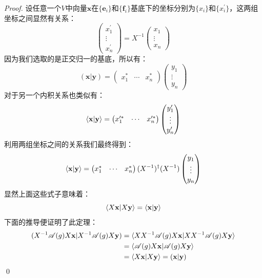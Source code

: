 \begin{proof}
	设任意一个$V$中向量$\mathbf{x}$在$\{\mathbf{e}_i\}$和$\{\mathbf{f}_i\}$基底下的坐标分别为$\{x_i\}$和$\{x^\prime_i\}$，这两组坐标之间显然有关系：
	\[\begin{pmatrix}
		{x^\prime_1} \\
		\vdots \\
		{x^\prime_n}
	\end{pmatrix}=X^{-1}\begin{pmatrix}
		{x_1} \\
		\vdots \\
		{x_n}
	\end{pmatrix}\]
	因为我们选取的是正交归一的基底，所以有：
	\[(\mathbf{x}|\mathbf{y}) = \begin{pmatrix}
		x_1^*& \cdots  &x_n^*
	\end{pmatrix}\begin{pmatrix}
		{y_1} \\
		\vdots \\
		{y_n}
	\end{pmatrix}\]
	对于另一个内积关系也类似有：
	\[\braket{\mathbf{x}|\mathbf{y}} = \begin{pmatrix}
		x_1^{\prime*}& \cdots  &x_n^{\prime*}
	\end{pmatrix}\begin{pmatrix}
		y_1^{\prime} \\
		\vdots \\
		y_n^{\prime}
	\end{pmatrix}\]
	利用两组坐标之间的关系我们最终得到：
	\[\braket{\mathbf{x}|\mathbf{y}} = \begin{pmatrix}
		x_1^*& \cdots  &x_n^*
	\end{pmatrix}(X^{-1})^{\dagger}(X^{-1})\begin{pmatrix}
		{y_1} \\
		\vdots \\
		{y_n}
	\end{pmatrix}\]
	显然上面这些式子意味着：
	\[\braket{X\mathbf{x}|X\mathbf{y}}=\braket{\mathbf{x}|\mathbf{y}}\]
	下面的推导便证明了此定理：
	\begin{align*}
		(X^{-1}\mathscr{A}(g)X\mathbf{x}|X^{-1}\mathscr{A}(g)X\mathbf{y})&=\braket{XX^{-1}\mathscr{A}(g)X\mathbf{x}|XX^{-1}\mathscr{A}(g)X\mathbf{y}}\\
		&=\braket{\mathscr{A}(g)X\mathbf{x}|\mathscr{A}(g)X\mathbf{y}}\\
		&=\braket{X\mathbf{x}|X\mathbf{y}}=(\mathbf{x}|\mathbf{y})
	\end{align*}
	\qed
\end{proof}


